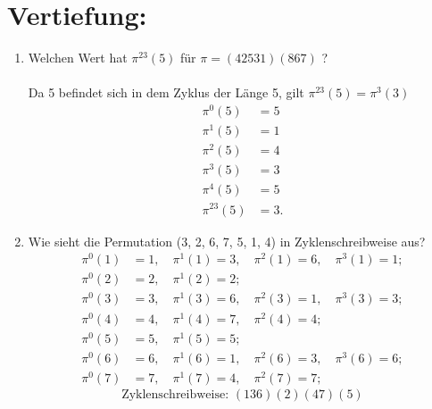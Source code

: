 



    \maketitle
    \section*{Vertiefung:}
    \begin{enumerate}[label=(\alph*)]
        \item Welchen Wert hat $\pi^{23}(5)$ f\"ur $\pi=(4 2 5 3 1)(8 6 7)$ ?\\\\
        Da 5 befindet sich in dem Zyklus der Länge 5, gilt $\pi^{23}(5)=\pi^{3}(3)$
        \begin{align*}
	        \pi^{0}(5) &= 5\\
	        \pi^1(5) &= 1\\
	        \pi^2(5) &= 4\\
	        \pi^3(5) &= 3\\
	        \pi^4(5) &= 5\\ %
	        \pi^{23}(5)&=3.
        \end{align*}
        
        \item Wie sieht die Permutation (3, 2, 6, 7, 5, 1, 4) in Zyklenschreibweise aus?
        \begin{align*}
            \pi^0(1) &= 1, \quad \pi^1(1) = 3, \quad \pi^2(1)=6, \quad \pi^3(1)=1; \\
            \pi^0(2) &= 2, \quad \pi^1(2) = 2; \\
            \pi^0(3) &= 3, \quad \pi^1(3) = 6, \quad \pi^2(3)=1, \quad \pi^3(3)=3; \\
            \pi^0(4) &= 4, \quad \pi^1(4) = 7, \quad \pi^2(4)=4; \\
            \pi^0(5) &= 5, \quad \pi^1(5) = 5; \\
            \pi^0(6) &= 6, \quad \pi^1(6) = 1, \quad \pi^2(6)=3, \quad \pi^3(6)=6; \\
            \pi^0(7) &= 7, \quad \pi^1(7) = 4, \quad \pi^2(7)=7;
        \end{align*}
       	\[\textrm{Zyklenschreibweise: } (136)(2)(47)(5)\]
        

\end{enumerate}
